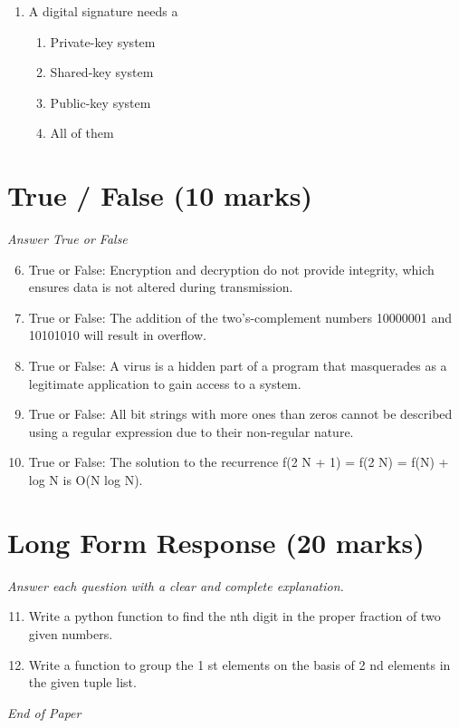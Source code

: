 \documentclass[12pt]{article}
\begin{document}
\begin{enumerate}[label=\arabic*.]
\begin{enumerate}[label=(\alph*)]
    \item The file system is likely to be corrupted when a computer crashes
    \item A much higher amount of network traffic results
    \item Caching makes file migration impossible
\end{enumerate}
\item A digital signature needs a
\begin{enumerate}[label=(\alph*)]
    \item Private-key system
    \item Shared-key system
    \item Public-key system
    \item All of them
\end{enumerate}
\end{enumerate}

\section*{True / False (10 marks)}
\textit{Answer True or False}
\begin{enumerate}[label=\arabic*.]
\setcounter{enumi}{5}
\item True or False: Encryption and decryption do not provide integrity, which ensures data is not altered during transmission.
\item True or False: The addition of the two's-complement numbers 10000001 and 10101010 will result in overflow.
\item True or False: A virus is a hidden part of a program that masquerades as a legitimate application to gain access to a system.
\item True or False: All bit strings with more ones than zeros cannot be described using a regular expression due to their non-regular nature.
\item True or False: The solution to the recurrence f(2 N + 1) = f(2 N) = f(N) + log N is O(N log N).
\end{enumerate}

\section*{Long Form Response (20 marks)}
\textit{Answer each question with a clear and complete explanation.}
\begin{enumerate}[label=\arabic*.]
\setcounter{enumi}{10}
\item Write a python function to find the nth digit in the proper fraction of two given numbers.
\item Write a function to group the 1 st elements on the basis of 2 nd elements in the given tuple list.
\end{enumerate}

\vfill
\noindent\textit{End of Paper}
\end{document}
